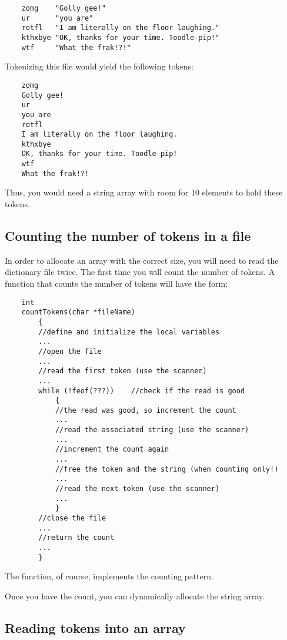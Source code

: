 \documentclass[12pt]{article}
\begin{document}
\begin{verbatim}
    zomg    "Golly gee!"
    ur      "you are"
    rotfl   "I am literally on the floor laughing."
    kthxbye "OK, thanks for your time. Toodle-pip!"
    wtf     "What the frak!?!"
\end{verbatim}

Tokenizing this file would yield the following tokens:

\begin{verbatim}
    zomg
    Golly gee!
    ur
    you are
    rotfl
    I am literally on the floor laughing.
    kthxbye
    OK, thanks for your time. Toodle-pip!
    wtf
    What the frak!?!
\end{verbatim}

Thus, you would need a string array with room for 10 elements
to hold these tokens.

\subsection*{Counting the number of tokens in a file}

In order to allocate an array with the correct size,
you will need to read the dictionary file twice. The first time
you will count the number of tokens. A function that counts
the number of tokens will have the form:

\begin{verbatim}
    int
    countTokens(char *fileName)
        {
        //define and initialize the local variables
        ...
        //open the file
        ...
        //read the first token (use the scanner)
        ...
        while (!feof(???))    //check if the read is good
            {
            //the read was good, so increment the count
            ...
            //read the associated string (use the scanner)
            ...
            //increment the count again
            ...
            //free the token and the string (when counting only!)
            ...
            //read the next token (use the scanner)
            ...
            }
        //close the file
        ...
        //return the count
        ...
        }
\end{verbatim}

The function, of course, implements the counting pattern.

Once you have the count, you can dynamically allocate the string array.

\subsection*{Reading tokens into an array}
\end{document}
